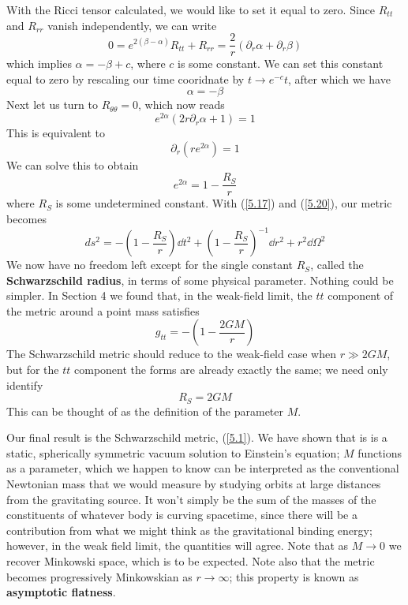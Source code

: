 With the Ricci tensor calculated, we would like to set it equal to zero. Since $R_{tt}$ and $R_{rr}$ vanish independently, we can write
\begin{equation*}
    0=e^{2(\beta-\alpha)}R_{tt}+R_{rr}=\frac{2}{r}(\partial_r\alpha+\partial_r\beta)
\end{equation*}
which implies $\alpha=-\beta +c$, where $c$ is some constant. We can set this constant equal to zero by rescaling our time cooridnate by $t\to e^{-c}t$, after which we have
\begin{equation}\label{5.17}
    \alpha=-\beta
\end{equation}
Next let us turn to $R_{\theta\theta}=0$, which now reads
\begin{equation*}
    e^{2\alpha}(2r\partial_r\alpha +1)=1
\end{equation*}
This is equivalent to
\begin{equation*}
    \partial_r(re^{2\alpha})=1
\end{equation*}
We can solve this to obtain
\begin{equation}\label{5.20}
    e^{2\alpha}=1-\frac{R_S}{r}
\end{equation}
where $R_S$ is some undetermined constant. With (\ref{5.17}) and (\ref{5.20}), our metric becomes
\begin{equation*}
    ds^2=-\left(1-\frac{R_S}{r}\right)\dd t^2+\left(1-\frac{R_S}{r}\right)^{-1}\dd r^2+r^2\dd\Omega^2
\end{equation*}
We now have no freedom left except for the single constant $R_S$, called the \textbf{Schwarzschild radius}, in terms of some physical parameter. Nothing could be simpler. In Section 4 we found that, in the weak-field limit, the $tt$ component of the metric around a point mass satisfies
\begin{equation*}
    g_{tt}=-\left(1-\frac{2GM}{r}\right)
\end{equation*}
The Schwarzschild metric should reduce to the weak-field case when $r\gg 2GM$, but for the $tt$ component the forms are already exactly the same; we need only identify
\begin{equation*}
    R_S=2GM
\end{equation*}
This can be thought of as the definition of the parameter $M$.

Our final result is the Schwarzschild metric, (\ref{5.1}). We have shown that is is a static, spherically symmetric vacuum solution to Einstein's equation; $M$ functions as a parameter, which we happen to know can be interpreted as the conventional Newtonian mass that we would measure by studying orbits at large distances from the gravitating source. It won't simply be the sum of the masses of the constituents of whatever body is curving spacetime, since there will be a contribution from what we might think as the gravitational binding energy; however, in the weak field limit, the quantities will agree. Note that as $M\to 0$ we recover Minkowski space, which is to be expected. Note also that the metric becomes progressively Minkowskian as $r\to\infty$; this property is known as \textbf{asymptotic flatness}.









